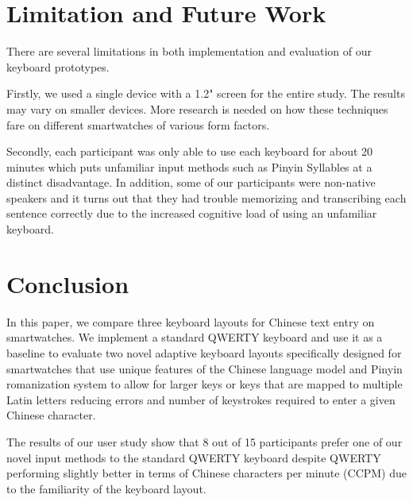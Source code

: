 \chapter{Limitation and Future Work}
\label{c:limitation and future work}


There are several limitations in both implementation and evaluation of our keyboard prototypes.

Firstly, we used a single device with a 1.2" screen for the entire study. The results may vary on smaller devices. More research is needed on how these techniques fare on different smartwatches of various form factors.

Secondly, each participant was only able to use each keyboard for about 20 minutes which puts unfamiliar input methods such as Pinyin Syllables at a distinct disadvantage. In addition, some of our participants were non-native speakers and it turns out that they had trouble memorizing and transcribing each sentence correctly due to the increased cognitive load of using an unfamiliar keyboard.


\chapter{Conclusion}
\label{c:conclusion}


In this paper, we compare three keyboard layouts for Chinese text entry on smartwatches. We implement a standard QWERTY keyboard and use it as a baseline to evaluate two novel adaptive keyboard layouts specifically designed for smartwatches that use unique features of the Chinese language model and Pinyin romanization system to allow for larger keys or keys that are mapped to multiple Latin letters reducing errors and number of keystrokes required to enter a given Chinese character.

The results of our user study show that 8 out of 15 participants prefer one of our novel input methods to the standard QWERTY keyboard despite QWERTY performing slightly better in terms of Chinese characters per minute (CCPM) due to the familiarity of the keyboard layout.
